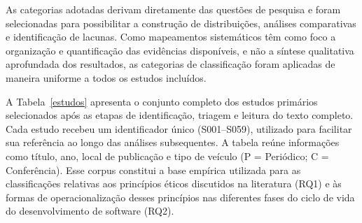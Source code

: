 As categorias adotadas derivam diretamente das questões de pesquisa e foram selecionadas para possibilitar a construção de distribuições, análises comparativas e identificação de lacunas. Como mapeamentos sistemáticos têm como foco a organização e quantificação das evidências disponíveis, e não a síntese qualitativa aprofundada dos resultados, as categorias de classificação foram aplicadas de maneira uniforme a todos os estudos incluídos.

A Tabela~\ref{estudos} apresenta o conjunto completo dos estudos primários selecionados após as etapas de identificação, triagem e leitura do texto completo. Cada estudo recebeu um identificador único (S001--S059), utilizado para facilitar sua referência ao longo das análises subsequentes. A tabela reúne informações como título, ano, local de publicação e tipo de veículo (P = Periódico; C = Conferência). Esse corpus constitui a base empírica utilizada para as classificações relativas aos princípios éticos discutidos na literatura (RQ1) e às formas de operacionalização desses princípios nas diferentes fases do ciclo de vida do desenvolvimento de software (RQ2).

